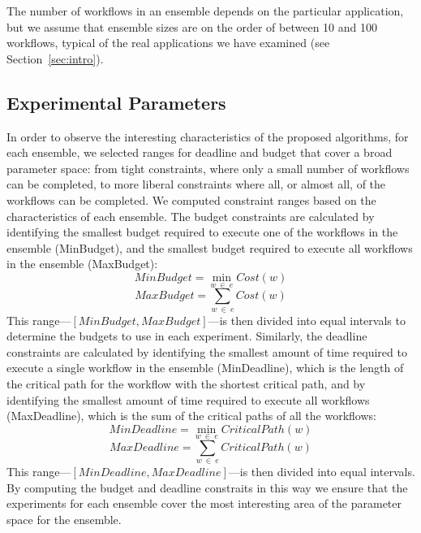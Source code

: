 \documentclass[conference]{IEEEtran}
\begin{document}
The number of workflows in an ensemble depends on the particular application,
but we assume that ensemble sizes are on the order of between 10 and 100
workflows, typical of the real applications we have examined (see Section~\ref{sec:intro}). 



\subsection{Experimental Parameters}
\label{sec:exp-parameters}

In order to observe the interesting characteristics of the proposed algorithms,
for each ensemble, we selected ranges for deadline and budget that cover a broad
parameter space: from tight constraints, where only a small number of workflows can be completed,
to more liberal constraints where all, or almost all, of the workflows can be
completed. We computed constraint ranges based on
the characteristics of each ensemble. The budget constraints are calculated by
identifying the smallest budget required to execute one of the workflows in the
ensemble (MinBudget), and the smallest budget required to execute all workflows
in the ensemble (MaxBudget):
%
%
$$
MinBudget = \min_{w\ \in\ e}{Cost(w)}
$$
$$
MaxBudget = \sum_{w\ \in\ e}{Cost(w)}
$$
%
This range---$[MinBudget, MaxBudget]$---is then divided into equal intervals to
determine the budgets to use in each experiment. Similarly, the deadline
constraints are calculated by identifying the smallest amount
of time required to execute a single workflow in the ensemble (MinDeadline),
which is the length of the critical path for the workflow with the shortest
critical path, and by identifying the smallest amount of time required to
execute all workflows (MaxDeadline), which is the sum of the critical paths of
all the workflows:
%
%
$$
MinDeadline = \min_{w\ \in\ e}{CriticalPath(w)}
$$
$$
MaxDeadline = \sum_{w\ \in\ e}{CriticalPath(w)}
$$
%
This range---$[MinDeadline, MaxDeadline]$---is then divided into equal intervals. 
By computing the budget and deadline constraits in this way we ensure that the
experiments for each ensemble cover the most interesting area of the parameter space for the
ensemble.
\end{document}
